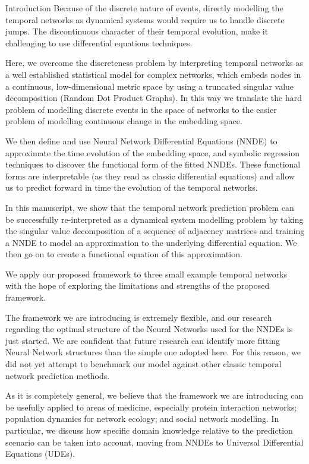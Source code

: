 \documentclass[12pt]{amsart}
\begin{document}
\begin{section}{Introduction}
    Because of the discrete nature of events, directly modelling the temporal networks as dynamical systems would require us to handle discrete jumps. The discontinuous character of their temporal evolution, make it challenging to use differential equations techniques.

    Here, we overcome the discreteness problem by interpreting temporal networks as a well established statistical model for complex networks, which embeds nodes in a continuous, low-dimensional metric space by using a truncated singular value decomposition (Random Dot Product Graphs\cite{athreya2017statistical}). In this way we translate the hard problem of modelling discrete events in the space of networks to the easier problem of modelling continuous change in the embedding space. 
    
    We then define and use Neural Network Differential Equations (NNDE)\cite{SciML_C_Rak} to approximate the time evolution of the embedding space, and symbolic regression techniques to discover the functional form of the fitted NNDEs. These functional forms are interpretable (as they read as classic differential equations) and allow us to predict forward in time the evolution of the temporal networks.

    In this manuscript, we show that the temporal network prediction problem can be successfully re-interpreted as a dynamical system modelling problem by taking the singular value decomposition of a sequence of adjacency matrices and training a NNDE to model an approximation to the underlying differential equation. We then go on to create a functional equation of this approximation. 

    We apply our proposed framework to three small example temporal networks with the hope of exploring the limitations and strengths of the proposed framework. 

    The framework we are introducing is extremely flexible, and our research regarding the optimal structure of the Neural Networks used for the NNDEs is just started.
    We are confident that future research can identify more fitting Neural Network structures than the simple one adopted here.
    For this reason, we did not yet attempt to benchmark our model against other classic temporal network prediction methods.

    As it is completely general, we believe that the framework we are introducing can be usefully applied to areas of medicine, especially protein interaction networks; population dynamics for network ecology; and social network modelling. In particular, we discuss how specific domain knowledge relative to the prediction scenario can be taken into account, moving from NNDEs to Universal Differential Equations (UDEs).
\end{section}
\end{document}
